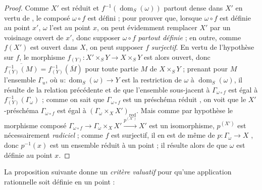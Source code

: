 \begin{proof}
Comme $X'$ est réduit et $f^{-1}(\operatorname{dom}_S(\omega))$ partout dense dans $X'$ en vertu de , le composé $\omega\circ f$ est défini ; pour prouver que, lorsque $\omega\circ f$ est définie au point $x'$, $\omega$ l'est au point $x$, on peut évidemment remplacer $X'$ par un voisinage ouvert de $x'$, donc supposer $\omega\circ f$ \emph{partout définie} ; en outre, comme $f(X')$ est ouvert dans $X$, on peut supposer $f$ \emph{surjectif}.
En vertu de l'hypothèse sur $f$, le morphisme $f_{(Y)}:X'\times_S Y\to X\times_S Y$ est alors ouvert, donc $\overline{f_{(Y)}^{-1}(M)}=f_{(Y)}^{-1}(\overline{M})$ pour toute partie $M$ de $X\times_S Y$ ; prenant pour $M$ l'ensemble $\Gamma_u$, où $u:\operatorname{dom}_S(\omega)\to Y$ est la restriction de $\omega$ à $\operatorname{dom}_S(\omega)$, il résulte de la relation précédente et de  que l'ensemble sous-jacent à $\Gamma_{\omega\circ f}$ est égal à $f_{(Y)}^{-1}(\Gamma_\omega)$ ; comme on sait
que $\Gamma_{\omega\circ f}$ est un préschéma réduit , on voit que le $X'$-préschéma $\Gamma_{\omega\circ f}$ est égal à $(\Gamma_\omega\times_X X')_\mathrm{red}$.
Mais comme par hypothèse le morphisme composé $\Gamma_{\omega\circ f}\to\Gamma_\omega\times_X X'\xrightarrow{p^{(X')}}X'$ est un isomorphisme, $p^{(X')}$ est nécessairement \emph{radiciel} ; comme $f$ est surjectif, il en est de même de $p:\Gamma_\omega\to X$ , donc $p^{-1}(x)$ est un ensemble réduit à un point  ; il résulte alors de  que $\omega$ est définie au point $x$.
\end{proof}

La proposition suivante donne un \emph{critère valuatif} pour qu'une application rationnelle soit définie en un point :

